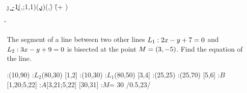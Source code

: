 


\MULTIPLY{}\j
\MULTIPLY{}\k
\ADD\ve\vf\a
\SUBTRACT\a\k\b
\MULTIPLY\b{-1}\c
\SOLVELINEARSYSTEM(\vc,\vd;1,1)(\c,\j)(\g,\h)
\EXPR[0]\v{(\vc * \g + \ve)}
\EXPR[0]\w{(\vd * \h + \vf)}

\SUBTRACT\v\vb\pp
\SUBTRACT\g\va\qq
\FRACTIONSIMPLIFY\pp\qq\p\q
\EXPR[0]{\acn}{(\q * \vb - \p * \va)}

\question[4] The segment of a line between two other lines $L_1: 2 x - y + 7 = 0$ and $L_2: 3 x -y + 9 = 0$ 
is bisected at the point $M = (3, -5)$. Find the equation of the line.

\watchout[-10pt]

  :(10,90)
  :$L_2$(80,30)
   [1,2]
  :(10,30)
  :$L_1$(80,50)
   [3,4]
  :(25,25)
  :(25,70)
   [5,6]
  :$B$[1,20;5,22]
  :$A$[3,21;5,22]
   [30,31]
  :$M$= 30 /0.5,23/
\figdrawbegin{}
  \figdrawline [1,2]
  \figdrawline [3,4]
  \figdrawline [30,31]
\figdrawend
{}

\ifprintanswers
  \vspace{0.7cm}
  \centerline{\box\figBoxA}
\fi 

